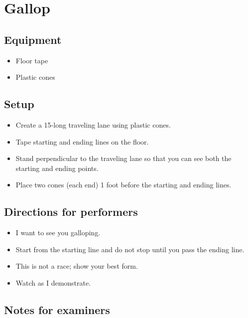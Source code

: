 \documentclass[
  letterpaper,
  DIV=11,
  numbers=noendperiod]{scrreprt}
\providecommand{\tightlist}{%
  \setlength{\itemsep}{0pt}\setlength{\parskip}{0pt}}
\begin{document}
\section{Gallop}\label{gallop}

\subsection{Equipment}\label{equipment-10}

\begin{itemize}
\tightlist
\item
  Floor tape
\item
  Plastic cones
\end{itemize}

\subsection{Setup}\label{setup-9}

\begin{itemize}
\tightlist
\item
  Create a 15-long traveling lane using plastic cones.
\item
  Tape starting and ending lines on the floor.
\item
  Stand perpendicular to the traveling lane so that you can see both the
  starting and ending points.
\item
  Place two cones (each end) 1 foot before the starting and ending
  lines.
\end{itemize}

\subsection{Directions for
performers}\label{directions-for-performers-9}

\begin{itemize}
\tightlist
\item
  I want to see you galloping.
\item
  Start from the starting line and do not stop until you pass the ending
  line.
\item
  This is not a race; show your best form.
\item
  Watch as I demonstrate.
\end{itemize}

\subsection{Notes for examiners}\label{notes-for-examiners-9}
\end{document}
